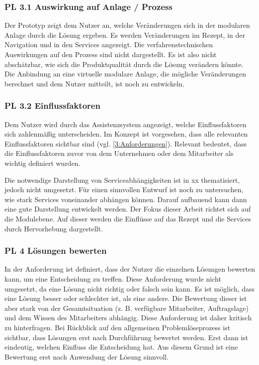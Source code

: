 \subsubsection*{PL 3.1 Auswirkung auf Anlage / Prozess}
Der Prototyp zeigt dem Nutzer an, welche Veränderungen sich in der modularen Anlage durch die Lösung ergeben. Es werden Veränderungen im Rezept, in der Navigation und in den Services angezeigt. Die verfahrenstechnischen Auswirkungen auf den Prozess sind nicht dargestellt. Es ist also nicht abschätzbar, wie sich die Produktqualität durch die Lösung verändern könnte. Die Anbindung an eine virtuelle modulare Anlage, die mögliche Veränderungen berechnet und dem Nutzer mitteilt, ist noch zu entwickeln.

\subsubsection*{PL 3.2 Einflussfaktoren}
Dem Nutzer wird durch das Assistenzsystem angezeigt, welche Einflussfaktoren sich zahlenmäßig unterscheiden. Im Konzept ist vorgesehen, dass alle relevanten Einflussfaktoren sichtbar sind (vgl. \ref{3:Anforderungen}). Relevant bedeutet, dass die Einflussfaktoren zuvor von dem Unternehmen oder dem Mitarbeiter als wichtig definiert wurden.

Die notwendige Darstellung von Serviceabhängigkeiten ist in xx thematisiert, jedoch nicht umgesetzt. Für einen sinnvollen Entwurf ist noch zu untersuchen, wie stark Services voneinander abhängen können. Darauf aufbauend kann dann eine gute Darstellung entwickelt werden. Der Fokus dieser Arbeit richtet sich auf die Modulebene. Auf dieser werden die Einflüsse auf das Rezept und die Services durch Hervorhebung dargestellt.

\subsubsection*{PL 4 Lösungen bewerten}
In der Anforderung ist definiert, dass der Nutzer die einzelnen Lösungen bewerten kann, um eine Entscheidung zu treffen. Diese Anforderung wurde nicht umgesetzt, da eine Lösung nicht richtig oder falsch sein kann. Es ist möglich, dass eine Lösung besser oder schlechter ist, als eine andere. Die Bewertung dieser ist aber stark von der Gesamtsituation (z. B. verfügbare Mitarbeiter, Auftragslage) und dem Wissen des Mitarbeiters abhängig. Diese Anforderung ist daher kritisch zu hinterfragen. Bei Rückblick auf den allgemeinen Problemlöseprozess ist sichtbar, dass Lösungen erst nach Durchführung bewertet werden. Erst dann ist eindeutig, welchen Einfluss die Entscheidung hat. Aus diesem Grund ist eine Bewertung erst nach Anwendung der Lösung sinnvoll.

